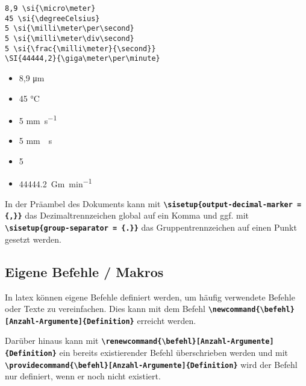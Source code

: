 \begin{minipage}[c]{0.6\textwidth}
    \begin{lstlisting}[language={[LaTeX]TeX}, lineskip=2pt]
8,9 \si{\micro\meter}               
45 \si{\degreeCelsius}              
5 \si{\milli\meter\per\second}      
5 \si{\milli\meter\div\second}      
5 \si{\frac{\milli\meter}{\second}} 
\SI{44444,2}{\giga\meter\per\minute}    
    \end{lstlisting}
\end{minipage}
\hfill
\begin{minipage}[c]{0.3\textwidth}
    \begin{itemize}[itemsep=2pt, label=$\rightarrow$]
        \item 8,9 \si{\micro\meter}
        \item 45 \si{\degreeCelsius}
        \item 5 \si{\milli\meter\per\second}
        \item 5 \si{\milli\meter\div\second}
        \item 5 \si{\frac{\milli\meter}{\second}}
        \item \SI{44444,2}{\giga\meter\per\minute}
    \end{itemize}
\end{minipage}

In der Präambel des Dokuments kann mit \texttt{\textbf{\textbackslash sisetup\{output-decimal-marker = \{,\}\}}} das Dezimaltrennzeichen global auf ein Komma und ggf. mit \textbf{\texttt{\textbackslash sisetup\{group-separator = \{.\}\}}} das Gruppentrennzeichen auf einen Punkt gesetzt werden.


\subsection{Eigene Befehle / Makros}
In latex können eigene Befehle definiert werden, um häufig verwendete Befehle oder Texte zu vereinfachen. Dies kann mit dem Befehl \textbf{\texttt{\textbackslash newcommand\{\textbackslash befehl\}[Anzahl-Argumente]\{Definition\}}} erreicht werden.

Darüber hinaus kann mit \textbf{\texttt{\textbackslash renewcommand\{\textbackslash befehl\}[Anzahl-Argumente]\{Definition\}}} ein bereits existierender Befehl überschrieben werden und mit \newline \textbf{\texttt{\textbackslash providecommand\{\textbackslash befehl\}[Anzahl-Argumente]\{Definition\}}} wird der Befehl nur definiert, wenn er noch nicht existiert.


